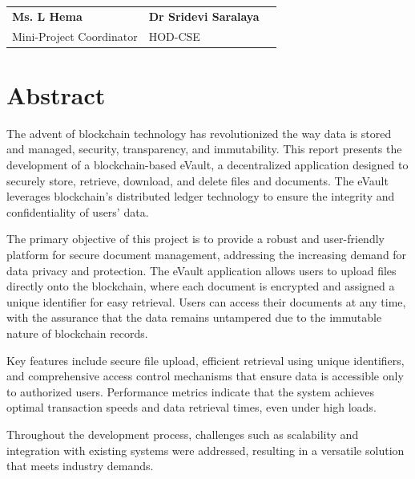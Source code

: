\documentclass[12pt,a4paper]{report}
\begin{document}
\vspace{0.55in}
\par
\vspace{0.65in}

\begin{tabularx}{0.95 \textwidth} { 
   >{\raggedright\arraybackslash}X 
   >{\centering\arraybackslash}X 
   >{\raggedleft\arraybackslash}X  }
     \textbf{Ms. L Hema} &  \textbf{Dr Sridevi Saralaya}\\
     Mini-Project Coordinator &   HOD-CSE \\
\end{tabularx}





\pagestyle{plain}
\chapter*{Abstract}
The advent of blockchain technology has revolutionized the 
way data is stored and managed, security, transparency, and 
immutability. This report presents the development of a 
blockchain-based eVault, a decentralized 
application designed to securely store, retrieve, download, 
and delete files and documents. The eVault leverages blockchain's 
distributed ledger technology to ensure the integrity and 
confidentiality of users' data.

The primary objective of this project is to provide a robust 
and user-friendly platform for secure document management, 
addressing the increasing demand for data privacy and protection. 
The eVault application allows users to upload files directly 
onto the blockchain, where each document is encrypted and 
assigned a unique identifier for easy retrieval. Users can 
access their documents at any time, with the assurance that 
the data remains untampered due to the immutable nature of 
blockchain records.
 
Key features include secure file upload, efficient retrieval 
using unique identifiers, and comprehensive access control 
mechanisms that ensure data is accessible only to authorized 
users. Performance metrics indicate that the system achieves 
optimal transaction speeds and data retrieval times, even 
under high loads.

Throughout the development process, challenges such as 
scalability and integration with existing systems were 
addressed, resulting in a versatile solution that meets industry 
demands. 
\end{document}
